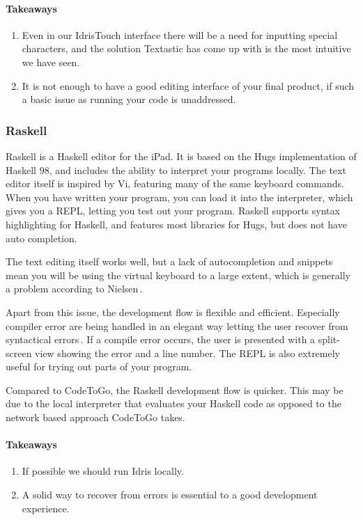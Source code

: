 \paragraph{Takeaways}
\begin{enumerate}
	\item Even in our IdrisTouch interface there will be a need for inputting special characters, and the solution Textastic has come up with is the most intuitive we have seen.
	\item It is not enough to have a good editing interface of your final product, if such a basic issue as running your code is unaddressed.
\end{enumerate}


\subsubsection{Raskell}

Raskell is a Haskell editor for the iPad. It is based on the Hugs implementation of Haskell 98, and includes the ability to interpret your programs locally. The text editor itself is inspired by Vi, featuring many of the same keyboard commands. When you have written your program, you can load it into the interpreter, which gives you a REPL, letting you test out your program. Raskell supports syntax highlighting for Haskell, and features most libraries for Hugs, but does not have auto completion.

The text editing itself works well, but a lack of autocompletion and snippets mean you will be using the virtual keyboard to a large extent, which is generally a problem according to Nielsen\,\cite[pp. 76]{nielsen2013mobile}. 

Apart from this issue, the development flow is flexible and efficient. Especially compiler error are being handled in an elegant way letting the user recover from syntactical errors\,\cite{nielsen1990heuristic}. If a compile error occurs, the user is presented with a split-screen view showing the error and a line number. The REPL is also extremely useful for trying out parts of your program.

Compared to CodeToGo, the Raskell development flow is quicker. This may be due to the local interpreter that evaluates your Haskell code as opposed to the network based approach CodeToGo takes. 

\paragraph{Takeaways}
\begin{enumerate}
	\item If possible we should run Idris locally.
	\item A solid way to recover from errors is essential to a good development experience.
\end{enumerate}

